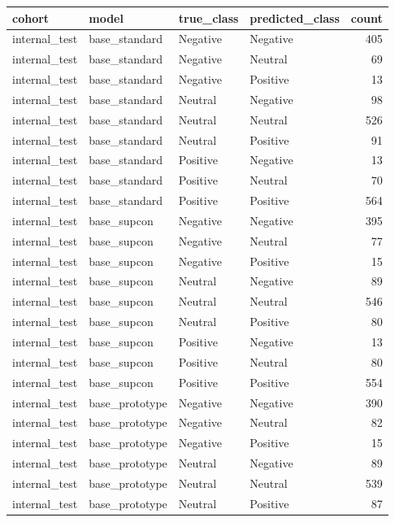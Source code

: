 \begin{tabular}{llllr}
\toprule
cohort & model & true\_class & predicted\_class & count \\
\midrule
internal\_test & base\_standard & Negative & Negative & 405 \\
internal\_test & base\_standard & Negative & Neutral & 69 \\
internal\_test & base\_standard & Negative & Positive & 13 \\
internal\_test & base\_standard & Neutral & Negative & 98 \\
internal\_test & base\_standard & Neutral & Neutral & 526 \\
internal\_test & base\_standard & Neutral & Positive & 91 \\
internal\_test & base\_standard & Positive & Negative & 13 \\
internal\_test & base\_standard & Positive & Neutral & 70 \\
internal\_test & base\_standard & Positive & Positive & 564 \\
internal\_test & base\_supcon & Negative & Negative & 395 \\
internal\_test & base\_supcon & Negative & Neutral & 77 \\
internal\_test & base\_supcon & Negative & Positive & 15 \\
internal\_test & base\_supcon & Neutral & Negative & 89 \\
internal\_test & base\_supcon & Neutral & Neutral & 546 \\
internal\_test & base\_supcon & Neutral & Positive & 80 \\
internal\_test & base\_supcon & Positive & Negative & 13 \\
internal\_test & base\_supcon & Positive & Neutral & 80 \\
internal\_test & base\_supcon & Positive & Positive & 554 \\
internal\_test & base\_prototype & Negative & Negative & 390 \\
internal\_test & base\_prototype & Negative & Neutral & 82 \\
internal\_test & base\_prototype & Negative & Positive & 15 \\
internal\_test & base\_prototype & Neutral & Negative & 89 \\
internal\_test & base\_prototype & Neutral & Neutral & 539 \\
internal\_test & base\_prototype & Neutral & Positive & 87 \\

\end{tabular}

